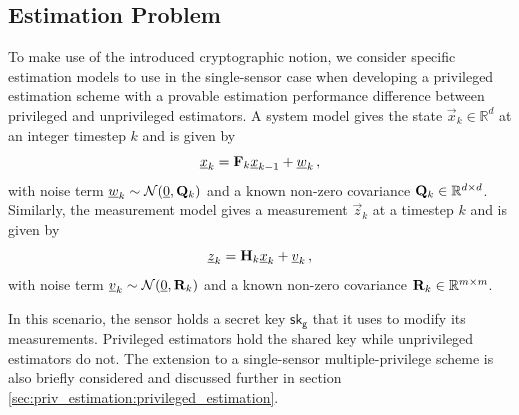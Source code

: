 % 
% 

\subsection{Estimation Problem}\label{subsec:priv_estimation:estimation_problem}
To make use of the introduced cryptographic notion, we consider specific estimation models to use in the single-sensor case when developing a privileged estimation scheme with a provable estimation performance difference between privileged and unprivileged estimators. A system model gives the state $\vec{x}_k\in\mathbb{R}^d$ at an integer timestep $k$ and is given by
\begin{equation}\label{eq:priv_estimation:system_model}
    {\underline{x}}_k = {{\mathbf{F}}}_k{\underline{x}}_{k-1} + {\underline{w}}_k\,,
\end{equation}
with noise term ${\underline{w}}_k\sim \mathcal{N}({\underline{0}}, {{\mathbf{Q}}}_k)$ and a known non-zero covariance ${{\mathbf{Q}}}_k\in \mathbb{R}^{d\times d}$. Similarly, the measurement model gives a measurement $\vec{z}_k$ at a timestep $k$ and is given by
\begin{equation}\label{eq:priv_estimation:single_sensor_measurement_model}
    {\underline{z}}_k = {{\mathbf{H}}}_k{\underline{x}}_k + {\underline{v}}_k\,,
\end{equation}
with noise term ${\underline{v}}_k\sim \mathcal{N}({\underline{0}}, {{\mathbf{R}}}_k)$ and a known non-zero covariance ${{\mathbf{R}}}_k\in \mathbb{R}^{m\times m}$.

In this scenario, the sensor holds a secret key $\mathsf{sk}_{\mathsf{g}}$ that it uses to modify its measurements. Privileged estimators hold the shared key while unprivileged estimators do not. The extension to a single-sensor multiple-privilege scheme is also briefly considered and discussed further in section \ref{sec:priv_estimation:privileged_estimation}.

% 
% 

